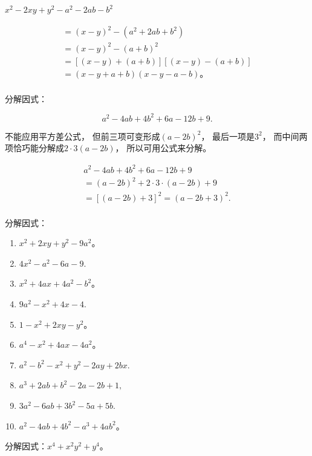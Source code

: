 \(x^{2} - 2xy + y^{2} - a^{2} - 2ab - b^{2}\)

\[
\begin{array}{l} = (x - y) ^{2} - \left(a ^{2} + 2 a b + b ^{2}\right) \\ = (x - y) ^{2} - (a + b) ^{2} \\ = [ (x - y) + (a + b) ] [ (x - y) - (a + b) ] \\ = (x - y + a + b) (x - y - a - b)\text{。} \\ \end{array}
\]

 分解因式：

\[
a ^{2} - 4 a b + 4 b ^{2} + 6 a - 12 b + 9.
\]

 不能应用平方差公式， 但前三项可变形成\((a - 2b)^2\)，
最后一项是\(3^2\)， 而中间两项恰巧能分解成\(2 \cdot 3(a - 2b)\)，
所以可用公式来分解。


\[
\begin{array}{l} a ^{2} - 4 a b + 4 b ^{2} + 6 a - 12 b + 9 \\ = (a - 2 b) ^{2} + 2 \cdot 3 \cdot (a - 2 b) + 9 \\ = [ (a - 2 b) + 3 ] ^{2} = (a - 2 b + 3) ^{2}. \\ \end{array}
\]

分解因式：

\begin{enumerate}[start=1]
\item
  \(x^{2} + 2xy + y^{2} - 9a^{2}\)。
\item
  \(4x^{2} - a^{2} - 6a - 9.\)
\item
  \(x^{2} + 4ax + 4a^{2} - b^{2}\)。
\item
  \(9a^{2} - x^{2} + 4x - 4.\)
\item
  \(1 - x^{2} + 2xy - y^{2}\)。
\item
  \(a^4 - x^2 + 4ax - 4a^2\)。
\item
  \(a^2 - b^2 - x^2 + y^2 - 2ay + 2bx.\)
\item
  \(a^3 + 2ab + b^2 - 2a - 2b + 1,\)
\item
  \(3a^{2} - 6ab + 3b^{2} - 5a + 5b.\)
\item
  \(a^2 - 4ab + 4b^2 - a^3 + 4ab^2\)。
\end{enumerate}

 分解因式：\(x^{4} + x^{2}y^{2} + y^{4}\)。

